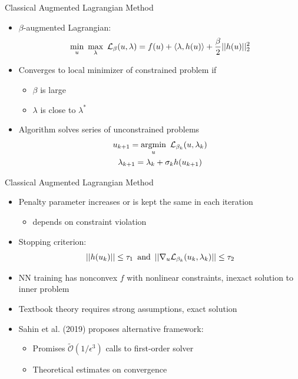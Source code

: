 \documentclass[11pt,t]{beamer}
\begin{document}
\begin{frame}[fragile]{Classical Augmented Lagrangian Method}
\begin{itemize}
	\item $\beta$-augmented Lagrangian:
	\begin{equation*}
		\underset{u}{\text{min}} \hspace{.5em} \underset{\lambda}{\text{max}} \hspace{.5em}  \mathcal{L}_\beta(u,\lambda) = f(u) + \langle\lambda,h(u)\rangle + \frac{\beta}{2} || h(u) ||^2_2
	\end{equation*}
	\item Converges to local minimizer of constrained problem if
	\begin{itemize}
		\item $\beta$ is large
		\item $\lambda$ is close to $\lambda^*$
	\end{itemize}
	\item Algorithm solves series of unconstrained problems
	\begin{gather*}
		u_{k+1} = \underset{u}{\text{argmin}} \hspace{.5em} \mathcal{L}_{\beta_k}(u,\lambda_k) \\
		\lambda_{k+1} = \lambda_k + \sigma_k h(u_{k+1})
	\end{gather*}
\end{itemize}
\end{frame}

\begin{frame}[fragile]{Classical Augmented Lagrangian Method}
\begin{itemize}
	\item Penalty parameter increases or is kept the same in each iteration
	\begin{itemize}
		\item depends on constraint violation
	\end{itemize}
	\item Stopping criterion:
	\begin{equation*}
		||h(u_k)|| \leq \tau_1 \hspace{.5em}\text{and}\hspace{.5em} ||\nabla_u\mathcal{L}_{\beta_k}(u_k,\lambda_k)|| \leq \tau_2
	\end{equation*}
	\item NN training has nonconvex $f$ with nonlinear constraints, inexact solution to inner problem
	\item Textbook theory requires strong assumptions, exact solution \relax
    \item Sahin et al. (2019) proposes alternative framework:
	\begin{itemize}
		\item Promises $\mathcal{\tilde{O}}(1/\epsilon^3)$ calls to first-order solver
		\item Theoretical estimates on convergence
	\end{itemize}
\end{itemize}
\end{frame}
\end{document}
